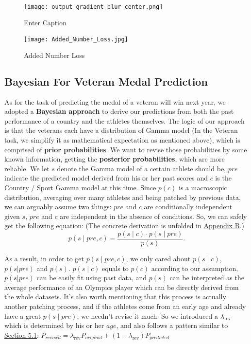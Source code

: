 \documentclass{mcmthesis}
\begin{document}
\begin{figure}[htbp]
    \centering
    \hspace*{0.1\textwidth} %
    \begin{minipage}{0.35\textwidth} %
        \centering
        \texttt{[image: output\_gradient\_blur\_center.png]}
        \caption{Enter Caption}
        \label{fig:output_gradient_blur_center}
    \end{minipage}
    \hfill
    \begin{minipage}{0.35\textwidth} %
        \centering
        \texttt{[image: Added\_Number\_Loss.jpg]}
        \caption{Added Number Loss}
        \label{fig:Added_Number_Loss}
    \end{minipage}
    \hspace*{0.1\textwidth} %
\end{figure}

\subsection{Bayesian For Veteran Medal Prediction}
\label{sec:5.2}

As for the task of predicting the medal of a veteran will win next year, we adopted a \textbf{Bayesian approach} to derive our predictions from both the past performance of a country and the athletes themselves. The logic of our approach is that the veterans each have a distribution of Gamma model (In the Veteran task, we simplify it as mathematical expectation as mentioned above), which is comprised of \textbf{prior probabilities}. We want to revise those probabilities by some known information, getting the \textbf{posterior probabilities}, which are more reliable. We let $s$ denote the Gamma model of a certain athlete should be, $pre$ indicate the predicted model derived from his or her past scores and $c$ is the Country / Sport Gamma model at this time. Since $p(c)$ is a macroscopic distribution, averaging over many athletes and being patched by previous data, we can arguably assume two things: $pre$ and $c$ are conditionally independent given $s$, $pre$ and $c$ are independent in the absence of conditions. So, we can safely get the following equation: (The concrete derivation is unfolded in \hyperref[appB]{Appendix B}.)
\[
p(s \mid pre, c) = \frac{p(s \mid c) \cdot p(s \mid pre)}{p(s)}.
\]

As a result, in order to get $p(s \mid pre, c)$, we only cared about $p(s \mid c)$, $p(s|pre)$ and $p(s)$. $p(s \mid c)$ equals to $p(c)$ according to our assumption, $p(s|pre)$ can be easily fit using past data, and $p(s)$ can be interpreted as the average performance of an Olympics player which can be directly derived from the whole datasets.
It's also worth mentioning that this process is actually another patching process, and if the athletes come from an early age and already have a great $p(s \mid pre)$, we needn't revise it much. So we introduced a $\lambda_{\text{rev}}$ which is determined by his or her $age$, and also follows a pattern similar to \hyperref[sec:5.1]{Section 5.1}: $P_{revised} = \lambda_{\text{rev}} P_{original} + (1 - \lambda_{\text{rev}}) P_{predicted}$
\end{document}
